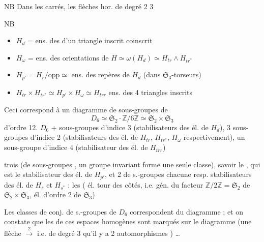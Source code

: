 \documentclass[11pt,a4paper]{article}
\begin{document}


NB Dans les carrés,  les flèches hor. de degré 2 \ill{} 3

NB
\begin{itemize}
  \item $H_d$ = ens. des  d'un triangle inscrit  coinscrit
  \item $H_\omega$ = ens. des orientations de $H \simeq \omega(H_d) \simeq H_{tr} \wedge H_{tr^*}$
  \item $H_{p'} = H_r/\mathrm{opp} \simeq$ ens. des repères de $H_d$ (dans $\mathfrak{S}_3$-torseurs)
  \item $H_{tr} \times H_{tr^*} \simeq H_{p'} \times H_\omega \simeq H_{trr}$ ens. des 4 triangles inscrits 
\end{itemize}
Ceci correspond à un diagramme de sous-groupes de
\[
  D_6 \simeq \mathfrak{S}_2 \cdot \mathbb{Z}/6\mathbb{Z} \simeq \mathfrak{S}_2 \times \mathfrak{S}_3
\]
d'ordre 12. $D_6$  +  \struck{\ill{}} sous-groupes  d'indice 3 (stabilisateurs des  él. de $H_d$), 3 sous-groupes d'indice 2  (stabilisateurs des él. de $H_{tr}$, $H_{tr^*}$, $H_\omega$ respectivement), un sous-groupe d'indice 4 (stabilisateur des él. de $H_{trr}$)

 trois   (de sous-groupes , \struck{\ill{}}   un groupe invariant  forme une seule classe), savoir le , qui est le stabilisateur des él. de $H_{p'}$, et 2   de  s.-groupes chacune \struck{\ill{}} resp. stabilisateurs des él. de $H_s$ et $H_{s^*}$ : les \struck{\ill{}}  ( él. \ill{} tour des côtés, i.e. gén. du facteur $\mathbb{Z}/2\mathbb{Z} = \mathfrak{S}_2$ de $\mathfrak{S}_2 \times \mathfrak{S}_3$,  él. d'ordre 2 de $\mathfrak{S}_3$) \struck{\ill{}}

Les classes de conj. de s.-groupes de $D_6$ correspondent   \struck{\ill{}}   \ill{} du diagramme  ; et on constate que les  de ces espaces homogènes sont  marqués sur le diagramme (une flèche $\xrightarrow{2}$ i.e. de degré 3  qu'il y a 2  \ill{} automorphismes \ill{}) …
\end{document}
